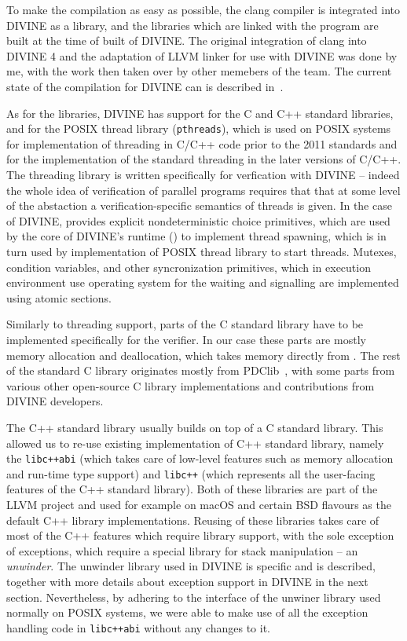 To make the compilation as easy as possible, the clang compiler is integrated
into DIVINE as a library, and the libraries which are linked with the program
are built at the time of built of DIVINE.
The original integration of clang into DIVINE 4 and the adaptation of LLVM
linker for use with DIVINE was done by me, with the work then taken over by
other memebers of the team.
The current state of the compilation for DIVINE can is described
in~\cite{BR2020}.

As for the libraries, DIVINE has support for the C and C++ standard libraries,
and for the POSIX thread library (\texttt{pthreads}), which is used on POSIX
systems for implementation of threading in C/C++ code prior to the 2011
standards and for the implementation of the standard threading in the later
versions of C/C++.
The threading library is written specifically for verfication with DIVINE --
indeed the whole idea of verification of parallel programs requires that that
at some level of the abstaction a verification-specific semantics of threads is
given.
In the case of DIVINE, \divm provides explicit nondeterministic choice
primitives, which are used by the core of DIVINE's runtime (\dios) to implement
thread spawning, which is in turn used by implementation of POSIX thread
library to start threads.
Mutexes, condition variables, and other syncronization primitives, which in
execution environment use operating system for the waiting and signalling are
implemented using atomic sections. 

Similarly to threading support, parts of the C standard library have to be
implemented specifically for the verifier.
In our case these parts are mostly memory allocation and deallocation, which
takes memory directly from \divm.
The rest of the standard C library originates mostly from
PDClib~\cite{TODO:pdclib}, with some parts from various other open-source C
library implementations and contributions from DIVINE developers.

The C++ standard library usually builds on top of a C standard library.
This allowed us to re-use existing implementation of C++ standard library,
namely the \texttt{libc++abi} (which takes care of low-level features such as
memory allocation and run-time type support) and \texttt{libc++} (which
represents all the user-facing features of the C++ standard library).
Both of these libraries are part of the LLVM project and used for example on
macOS and certain BSD flavours as the default C++ library implementations.
Reusing of these libraries takes care of most of the C++ features which require
library support, with the sole exception of exceptions, which require a special
library for stack manipulation -- an \emph{unwinder}.
The unwinder library used in DIVINE is \divm specific and is described,
together with more details about exception support in DIVINE in the next
section.
Nevertheless, by adhering to the interface of the unwiner library used normally
on POSIX systems, we were able to make use of all the exception handling code
in \texttt{libc++abi} without any changes to it.


